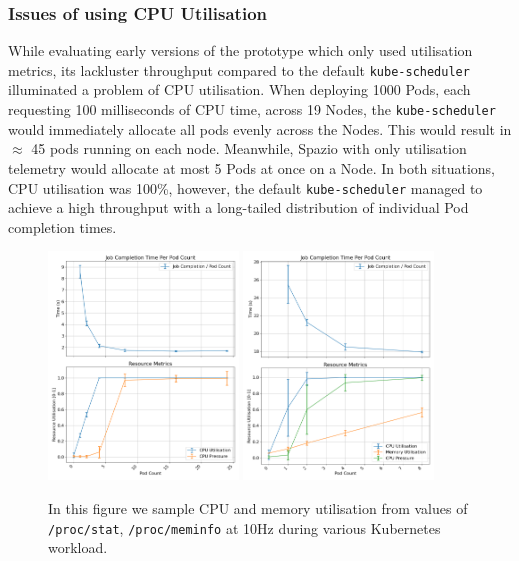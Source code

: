 \subsubsection{Issues of using CPU Utilisation}
\label{sec:issue-with-util}
While evaluating early versions of the prototype which only used utilisation
metrics, its lackluster throughput compared to the default \verb|kube-scheduler|
illuminated a problem of CPU utilisation. When deploying 1000 Pods, each
requesting 100 milliseconds of CPU time, across 19 Nodes, the
\verb|kube-scheduler| would immediately allocate all pods evenly across the
Nodes. This would result in $\approx$ 45 pods running on each node. Meanwhile,
Spazio with only utilisation telemetry would allocate at most 5 Pods at once on
a Node. In both situations, CPU utilisation was 100\%, however, the default
\verb|kube-scheduler| managed to achieve a high throughput with a long-tailed
distribution of individual Pod completion times.

\begin{figure}[H]
    \centering
    \includegraphics[width=0.45\textwidth]{images/podcount-util-pressure.png}
    \includegraphics[width=0.45\textwidth]{images/ml-podcount-util-pressure.png}
    \caption{In this figure we sample CPU and memory utilisation from
    values of \texttt{/proc/stat}, \texttt{/proc/meminfo} at 10Hz during various Kubernetes workload.}
    \label{fig:podcount-util-pressure}
\end{figure}

